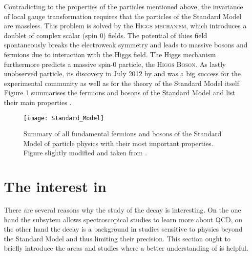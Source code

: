 Contradicting to the properties of the particles mentioned above, the invariance of local gauge transformation requires that the particles of the Standard Model are massless.
This problem is solved by the \textsc{Higgs mechanism}, which introduces a doublet of complex scalar (spin 0) fields.
The potential of thies field spontaneously breaks the electroweak symmetry and leads to massive bosons and fermions due to interaction with the Higgs field.
The Higgs mechanism furthermore predicts a massive spin-0 particle, the \textsc{Higgs Boson}.
As lastly unobserved particle, its discovery in July 2012 by \atlas \cite{Higgs_ATLAS} and \cms \cite{Higgs_CMS} was a big success for the experimental community as well as for the theory of the Standard Model itself. 
Figure \ref{fig:SM} summarises the fermions and bosons of the Standard Model and list their main properties \cite{Perkins_HEP, Burgess_SM, Meissner}.
\begin{figure}[ptb]
    \centering
	\texttt{[image: Standard\_Model]}	
	\caption{Summary of all fundamental fermions and bosons of the Standard Model of particle physics with their most important properties. Figure slightly modified and taken from \cite{SM_figure}.}
	\label{fig:SM}
\end{figure}

\section{The interest in \LbToDpmunuX}
There are several reasons why the study of the decay \LbToDpmunuX is interesting.
On the one hand the \Dz\proton subsytem allows spectroscopical studies to learn more about QCD, on the other hand the decay is a background in studies sensitive to physics beyond the Standard Model and thus limiting their precision.
This section ought to briefly introduce the areas and studies where a better understanding of \LbToDpmunuX is helpful.

